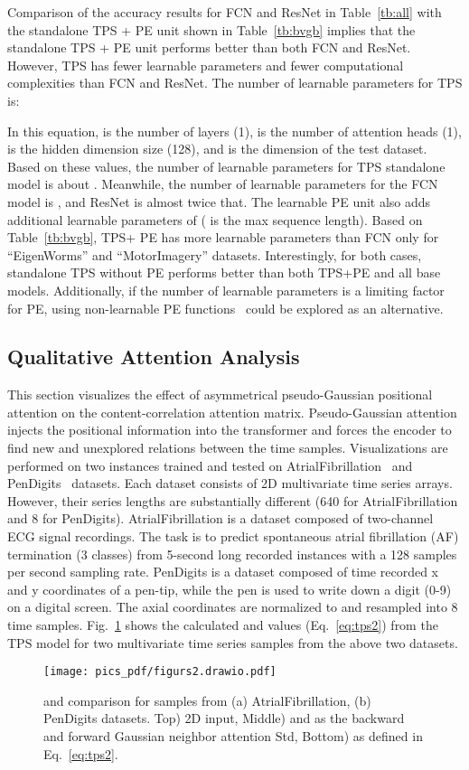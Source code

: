 \documentclass[journal]{IEEEtran}
\begin{document}
Comparison of the accuracy results for FCN and ResNet in Table~\ref{tb:all} with the standalone TPS + PE unit shown in Table~\ref{tb:bvgb} implies that the standalone TPS + PE unit performs better than both FCN and ResNet. However, TPS has fewer learnable parameters and fewer computational complexities than FCN and ResNet. The number of learnable parameters for TPS is:


In this equation,  is the number of layers (1),  is the number of attention heads (1),  is the hidden dimension size (128), and  is the dimension of the test dataset. Based on these values, the number of learnable parameters for TPS standalone model is about . Meanwhile, the number of learnable parameters for the FCN model is , and ResNet is almost twice that. The learnable PE unit also adds additional learnable parameters of  ( is the max sequence length). Based on Table~\ref{tb:bvgb}, TPS+ PE has more learnable parameters than FCN only for ``EigenWorms” and ``MotorImagery” datasets. Interestingly, for both cases, standalone TPS without PE performs better than both TPS+PE and all base models. Additionally, if the number of learnable parameters is a limiting factor for PE, using non-learnable PE functions~\cite{ vaswani2017attention} could be explored as an alternative.

\subsection{Qualitative Attention Analysis}
This section visualizes the effect of asymmetrical pseudo-Gaussian positional attention on the content-correlation attention matrix. Pseudo-Gaussian attention injects the positional information into the transformer and forces the encoder to find new and unexplored relations between the time samples. Visualizations are performed on two instances trained and tested on AtrialFibrillation~\cite{bagnall2018uea} and PenDigits~\cite{bagnall2018uea} datasets. Each dataset consists of 2D multivariate time series arrays. However, their series lengths are substantially different (640 for AtrialFibrillation and 8 for PenDigits). AtrialFibrillation is a dataset composed of two-channel ECG signal recordings. The task is to predict spontaneous atrial fibrillation (AF) termination (3 classes) from 5-second long recorded instances with a 128 samples per second sampling rate. PenDigits is a dataset composed of time recorded x and y coordinates of a pen-tip, while the pen is used to write down a digit (0-9) on a digital  screen. The axial coordinates are normalized to  and resampled into 8 time samples. Fig.~\ref{fig:pmap} shows the calculated  and  values (Eq.~\eqref{eq:tps2}) from the TPS model for two multivariate time series samples from the above two datasets.
\begin{figure}[!t]
\centering
\texttt{[image: pics\_pdf/figurs2.drawio.pdf]}
\caption{ and  comparison for samples from (a) AtrialFibrillation, (b) PenDigits datasets. Top) 2D input, Middle)  and  as the backward and forward Gaussian neighbor attention Std, Bottom)  as defined in Eq.~\eqref{eq:tps2}.}
\label{fig:pmap}
\end{figure}
\end{document}
